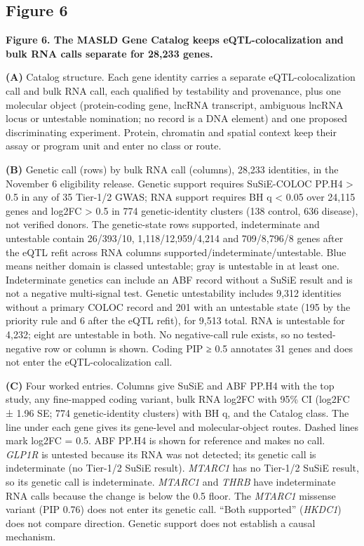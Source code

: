 \subsection{Figure 6}\label{figure-6}

\textbf{Figure 6. The MASLD Gene Catalog keeps eQTL-colocalization and bulk RNA calls separate for 28,233 genes.}

\textbf{(A)} Catalog structure. Each gene identity carries a separate eQTL-colocalization call and bulk RNA call, each qualified by testability and provenance, plus one molecular object (protein-coding gene, lncRNA transcript, ambiguous lncRNA locus or untestable nomination; no record is a DNA element) and one proposed discriminating experiment. Protein, chromatin and spatial context keep their assay or program unit and enter no class or route.

\textbf{(B)} Genetic call (rows) by bulk RNA call (columns), 28,233 identities, in the November 6 eligibility release. Genetic support requires SuSiE-COLOC PP.H4 \textgreater{} 0.5 in any of 35 Tier-1/2 GWAS; RNA support requires BH q \textless{} 0.05 over 24,115 genes and \textbar log2FC\textbar{} \textgreater{} 0.5 in 774 genetic-identity clusters (138 control, 636 disease), not verified donors. The genetic-state rows supported, indeterminate and untestable contain 26/393/10, 1,118/12,959/4,214 and 709/8,796/8 genes after the eQTL refit across RNA columns supported/indeterminate/untestable. Blue means neither domain is classed untestable; gray is untestable in at least one. Indeterminate genetics can include an ABF record without a SuSiE result and is not a negative multi-signal test. Genetic untestability includes 9,312 identities without a primary COLOC record and 201 with an untestable state (195 by the priority rule and 6 after the eQTL refit), for 9,513 total. RNA is untestable for 4,232; eight are untestable in both. No negative-call rule exists, so no tested-negative row or column is shown. Coding PIP ≥ 0.5 annotates 31 genes and does not enter the eQTL-colocalization call.

\textbf{(C)} Four worked entries. Columns give SuSiE and ABF PP.H4 with the top study, any fine-mapped coding variant, bulk RNA log2FC with 95\% CI (log2FC ± 1.96 SE; 774 genetic-identity clusters) with BH q, and the Catalog class. The line under each gene gives its gene-level and molecular-object routes. Dashed lines mark \textbar log2FC\textbar{} = 0.5. ABF PP.H4 is shown for reference and makes no call. \emph{GLP1R} is untested because its RNA was not detected; its genetic call is indeterminate (no Tier-1/2 SuSiE result). \emph{MTARC1} has no Tier-1/2 SuSiE result, so its genetic call is indeterminate. \emph{MTARC1} and \emph{THRB} have indeterminate RNA calls because the change is below the 0.5 floor. The \emph{MTARC1} missense variant (PIP 0.76) does not enter its genetic call. ``Both supported'' (\emph{HKDC1}) does not compare direction. Genetic support does not establish a causal mechanism.

